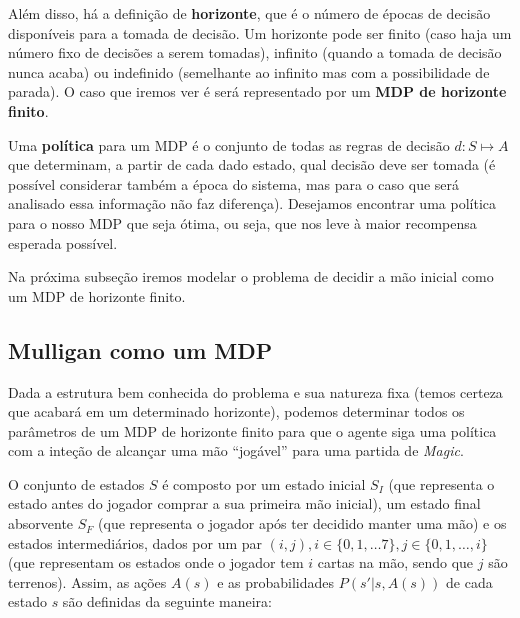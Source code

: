 \documentclass{book}
\begin{document}
Além disso, há a definição de \textbf{horizonte}, que é o número de épocas de decisão disponíveis para a tomada de decisão. Um horizonte pode ser finito (caso haja
um número fixo de decisões a serem tomadas), infinito (quando a tomada de decisão nunca acaba) ou indefinido (semelhante ao infinito mas com a possibilidade de parada).
O caso que iremos ver é será representado por um \textbf{MDP de horizonte finito}.

Uma \textbf{política} para um MDP é o conjunto de todas as regras de decisão $d: S \mapsto A$ que determinam, a partir de cada dado estado, qual decisão deve ser tomada
(é possível considerar também a época do sistema, mas para o caso que será analisado essa informação não faz diferença). Desejamos encontrar uma política para o
nosso MDP que seja ótima, ou seja, que nos leve à maior recompensa esperada possível.

Na próxima subseção iremos modelar o problema de decidir a mão inicial como um MDP de horizonte finito.

\subsection{Mulligan como um MDP}

Dada a estrutura bem conhecida do problema e sua natureza fixa (temos certeza que acabará em um determinado horizonte), podemos determinar todos os parâmetros de um MDP de horizonte finito para que o agente siga uma política com a inteção de alcançar uma mão ``jogável'' para uma partida de \textit{Magic}.

O conjunto de estados $S$ é composto por um estado inicial $S_I$ (que representa o estado antes do jogador comprar a sua primeira mão inicial),
um estado final absorvente $S_F$ (que representa o jogador após ter decidido manter uma mão) e os estados intermediários, dados por um par
$(i, j), i \in \{ 0, 1, \ldots 7\}, j \in \{ 0, 1, \ldots, i \}$ (que representam os estados onde o jogador tem $i$ cartas na mão, sendo que $j$ são terrenos). Assim, as ações $A(s)$ e as probabilidades $P(s'|s, A(s))$ de cada estado $s$ são definidas da seguinte maneira:
\end{document}
